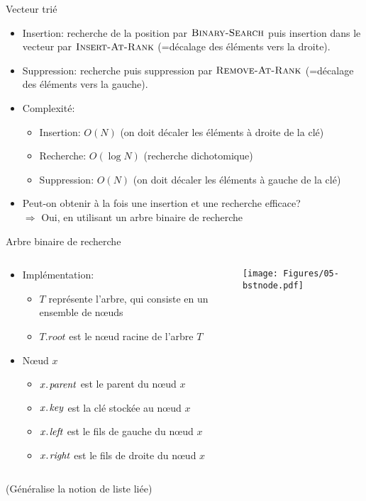 \begin{frame}{Vecteur trié}
\begin{itemize}
\item Insertion: recherche de la position par $\textnormal{\scshape Binary-Search}$ puis insertion dans le vecteur par $\textnormal{\scshape Insert-At-Rank}$ (=décalage des éléments vers la droite).
\item Suppression: recherche puis suppression par $\textnormal{\scshape Remove-At-Rank}$ (=décalage des éléments vers la gauche).
\item Complexité:
\begin{itemize}
\item Insertion: $O(N)$ (on doit décaler les éléments à droite de la clé)
\item Recherche: $O(\log N)$ (recherche dichotomique)
\item Suppression: $O(N)$ (on doit décaler les éléments à gauche de la clé)
\end{itemize}

\bigskip

\item Peut-on obtenir à la fois une insertion et une recherche
  efficace?\\$\Rightarrow$ Oui, en utilisant un arbre binaire de recherche
\end{itemize}

\end{frame}

\begin{frame}{Arbre binaire de recherche}
\begin{columns}
\begin{column}{7.5cm}
\begin{itemize}
\item Implémentation:
\begin{itemize}
\item $T$ représente l'arbre, qui consiste en un ensemble de n\oe uds
\item $T.root$ est le n\oe ud racine de l'arbre $T$
\end{itemize}
\item N\oe ud $x$
\begin{itemize}
\item $\attrib{x}{parent}$ est le parent du n\oe ud $x$
\item $\attrib{x}{key}$ est la clé stockée au n\oe ud $x$
\item $\attrib{x}{left}$ est le fils de  gauche du n\oe ud $x$
\item $\attrib{x}{right}$ est le fils de droite du n\oe ud $x$
\end{itemize}
\end{itemize}
\end{column}
\begin{column}{4cm}
\begin{center}
\texttt{[image: Figures/05-bstnode.pdf]}
\end{center}
\end{column}
\end{columns}

\bigskip

(Généralise la notion de liste liée)

\end{frame}

